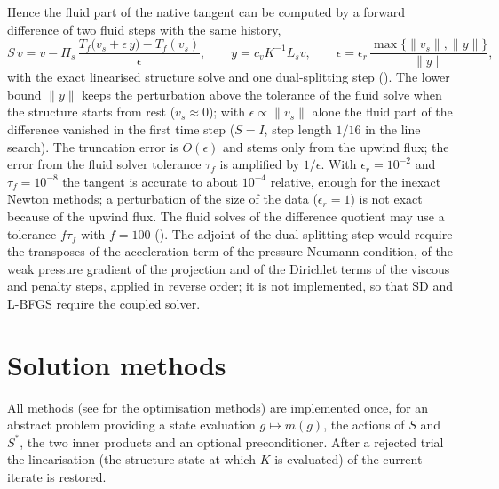 \documentclass[11pt,a4paper]{article}
\theoremstyle{definition}
\theoremstyle{remark}
\newcommand{\Pis}{\Pi_{s}}
\begin{document}
Hence the fluid part of the native tangent can be computed by a forward difference of two fluid
steps with the same history,
\begin{equation}\label{eq:fd_tangent}
  S\,v=v-\Pis\,\frac{T_f\big(v_s+\epsilon\,y\big)-T_f(v_s)}{\epsilon},\qquad
  y=c_vK^{-1}L_sv,\qquad \epsilon=\epsilon_r\,\frac{\max\{\|v_s\|,\|y\|\}}{\|y\|},
\end{equation}
with the exact linearised structure solve and one dual-splitting step (). The lower bound $\|y\|$ keeps the perturbation above the tolerance of the fluid solve when the
structure starts from rest ($v_s\approx0$); with $\epsilon\propto\|v_s\|$ alone the fluid part of the
difference vanished in the first time step ($S=I$, step length $1/16$ in the line search). The truncation error is $O(\epsilon)$ and stems only from the upwind flux; the error
from the fluid solver tolerance $\tau_f$ is amplified by $1/\epsilon$. With
$\epsilon_r=10^{-2}$ and $\tau_f=10^{-8}$ the tangent is accurate to about $10^{-4}$ relative,
enough for the inexact Newton methods; a perturbation of the size of the data ($\epsilon_r=1$) is
not exact because of the upwind flux. The fluid solves of the difference quotient may use a
tolerance $f\tau_f$ with $f=100$ (). The adjoint of the
dual-splitting step would require the transposes of the acceleration term of the pressure Neumann
condition, of the weak pressure gradient of the projection and of the Dirichlet terms of the
viscous and penalty steps, applied in reverse order; it is not implemented, so that SD and L-BFGS
require the coupled solver.

\section{Solution methods}\label{sec:methods}

All methods (see \cite{NocedalWright2006} for the optimisation methods) are implemented once, for an abstract problem providing a state evaluation
$g\mapsto m(g)$, the actions of $S$ and $S^*$, the two inner products and an optional
preconditioner. After a rejected trial the linearisation (the structure state at which $K$ is
evaluated) of the current iterate is restored.
\end{document}
